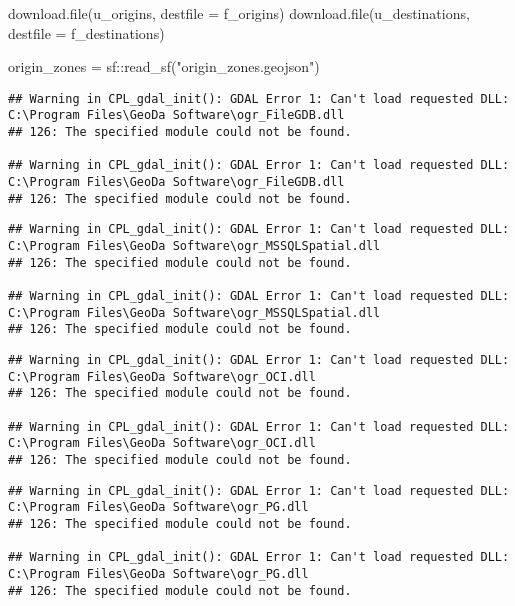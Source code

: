 \documentclass[11pt,letterpaper]{article}
\newenvironment{Shaded}{\begin{snugshade}}{\end{snugshade}}
\newcommand{\AttributeTok}[1]{\textcolor[rgb]{0.77,0.63,0.00}{#1}}
\newcommand{\FunctionTok}[1]{\textcolor[rgb]{0.00,0.00,0.00}{#1}}
\newcommand{\NormalTok}[1]{#1}
\newcommand{\OtherTok}[1]{\textcolor[rgb]{0.56,0.35,0.01}{#1}}
\newcommand{\SpecialCharTok}[1]{\textcolor[rgb]{0.00,0.00,0.00}{#1}}
\newcommand{\StringTok}[1]{\textcolor[rgb]{0.31,0.60,0.02}{#1}}
\begin{document}
\begin{Shaded}
\begin{Highlighting}[]
\FunctionTok{download.file}\NormalTok{(u\_origins, }\AttributeTok{destfile =}\NormalTok{ f\_origins)}
\FunctionTok{download.file}\NormalTok{(u\_destinations, }\AttributeTok{destfile =}\NormalTok{ f\_destinations)}
\end{Highlighting}
\end{Shaded}

\begin{Shaded}
\begin{Highlighting}[]
\NormalTok{origin\_zones }\OtherTok{=}\NormalTok{ sf}\SpecialCharTok{::}\FunctionTok{read\_sf}\NormalTok{(}\StringTok{"origin\_zones.geojson"}\NormalTok{)}
\end{Highlighting}
\end{Shaded}

\begin{verbatim}
## Warning in CPL_gdal_init(): GDAL Error 1: Can't load requested DLL: C:\Program Files\GeoDa Software\ogr_FileGDB.dll
## 126: The specified module could not be found.

## Warning in CPL_gdal_init(): GDAL Error 1: Can't load requested DLL: C:\Program Files\GeoDa Software\ogr_FileGDB.dll
## 126: The specified module could not be found.
\end{verbatim}

\begin{verbatim}
## Warning in CPL_gdal_init(): GDAL Error 1: Can't load requested DLL: C:\Program Files\GeoDa Software\ogr_MSSQLSpatial.dll
## 126: The specified module could not be found.

## Warning in CPL_gdal_init(): GDAL Error 1: Can't load requested DLL: C:\Program Files\GeoDa Software\ogr_MSSQLSpatial.dll
## 126: The specified module could not be found.
\end{verbatim}

\begin{verbatim}
## Warning in CPL_gdal_init(): GDAL Error 1: Can't load requested DLL: C:\Program Files\GeoDa Software\ogr_OCI.dll
## 126: The specified module could not be found.

## Warning in CPL_gdal_init(): GDAL Error 1: Can't load requested DLL: C:\Program Files\GeoDa Software\ogr_OCI.dll
## 126: The specified module could not be found.
\end{verbatim}

\begin{verbatim}
## Warning in CPL_gdal_init(): GDAL Error 1: Can't load requested DLL: C:\Program Files\GeoDa Software\ogr_PG.dll
## 126: The specified module could not be found.

## Warning in CPL_gdal_init(): GDAL Error 1: Can't load requested DLL: C:\Program Files\GeoDa Software\ogr_PG.dll
## 126: The specified module could not be found.
\end{verbatim}
\end{document}
